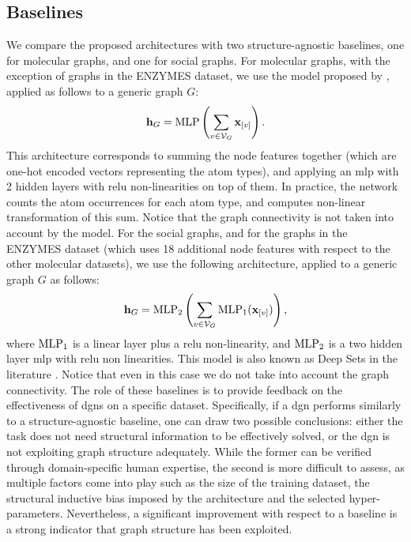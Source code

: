\subsection{Baselines}
We compare the proposed architectures with two structure-agnostic baselines, one for molecular graphs, and one for social graphs. For molecular graphs, with the exception of graphs in the ENZYMES dataset, we use the model proposed by \cite{?}, applied as follows to a generic graph $G$:
$$\Vector{h}_G = \Fun{MLP}\Paren{\sum_{v \in \Cal{V}_G} \Elem{x}{v}}.$$
This architecture corresponds to summing the node features together (which are one-hot encoded vectors representing the atom types), and applying an \gls{mlp} with 2 hidden layers with \gls{relu} non-linearities on top of them. In practice, the network counts the atom occurrences for each atom type, and computes non-linear transformation of this sum. Notice that the graph connectivity is not taken into account by the model.
For the social graphs, and for the graphs in the ENZYMES dataset (which uses 18 additional node features with respect to the other molecular datasets), we use the following architecture, applied to a generic graph $G$ as follows:
$$\Vector{h}_G = \Fun{MLP}_2\Paren{\sum_{v \in \Cal{V}_G} \Fun{MLP}_1(\Elem{x}{v})},$$
where $\mathrm{MLP}_1$ is a linear layer plus a \gls{relu} non-linearity, and $\mathrm{MLP}_2$ is a two hidden layer \gls{mlp} with \gls{relu} non linearities. This model is also known as Deep Sets in the literature \cite{?}. Notice that even in this case we do not take into account the graph connectivity. The role of these baselines is to provide feedback on the effectiveness of \glspl{dgn} on a specific dataset. Specifically, if a \gls{dgn} performs similarly to a structure-agnostic baseline, one can draw two possible conclusions: either the task does not need structural information to be effectively solved, or the \gls{dgn} is not exploiting graph structure adequately. While the former can be verified through domain-specific human expertise, the second is more difficult to assess, as multiple factors come into play such as the size of the training dataset, the structural inductive bias imposed by the architecture and the selected hyper-parameters. Nevertheless, a significant improvement with respect to a baseline is a strong indicator that graph structure has been exploited.

